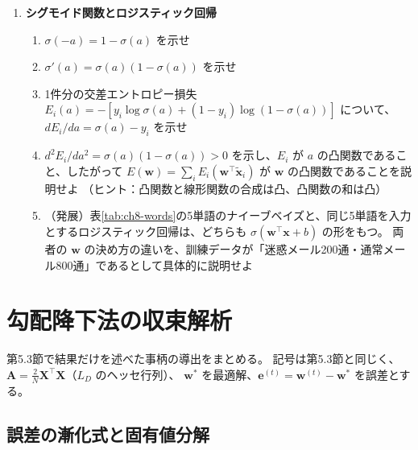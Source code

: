 \begin{enumerate}
  \item \textbf{シグモイド関数とロジスティック回帰}\quad
    \begin{enumerate}
      \item $\sigma(-a) = 1 - \sigma(a)$ を示せ
      \item $\sigma'(a) = \sigma(a)(1 - \sigma(a))$ を示せ
      \item 1件分の交差エントロピー損失 $E_i(a) = -[y_i \log\sigma(a) + (1 - y_i)\log(1 - \sigma(a))]$ について、$dE_i/da = \sigma(a) - y_i$ を示せ
      \item $d^2E_i/da^2 = \sigma(a)(1 - \sigma(a)) > 0$ を示し、$E_i$ が $a$ の凸関数であること、したがって $E(\bm{w}) = \sum_i E_i(\bm{w}^\top\tilde{\bm{x}}_i)$ が $\bm{w}$ の凸関数であることを説明せよ
        （ヒント：凸関数と線形関数の合成は凸、凸関数の和は凸）
      \item （発展）表\ref{tab:ch8-words}の5単語のナイーブベイズと、同じ5単語を入力とするロジスティック回帰は、どちらも $\sigma(\bm{w}^\top\bm{x} + b)$ の形をもつ。
        両者の $\bm{w}$ の決め方の違いを、訓練データが「迷惑メール200通・通常メール800通」であるとして具体的に説明せよ
    \end{enumerate}

\end{enumerate}


\clearpage
\appendix
\renewcommand{\theequation}{\Alph{section}.\arabic{equation}}
\renewcommand{\thefigure}{\Alph{section}.\arabic{figure}}
\section{勾配降下法の収束解析}
\label{sec:app-gd}

第5.3節で結果だけを述べた事柄の導出をまとめる。
記号は第5.3節と同じく、$\bm{A} = \frac{2}{N}\bm{X}^\top\bm{X}$（$L_D$ のヘッセ行列）、
$\bm{w}^*$ を最適解、$\bm{e}^{(t)} = \bm{w}^{(t)} - \bm{w}^*$ を誤差とする。

\subsection{誤差の漸化式と固有値分解}
\label{sec:app-gd-eig}

